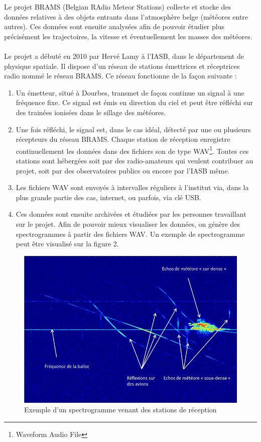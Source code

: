 \documentclass[11pt]{article}
\begin{document}
Le projet BRAMS (Belgian RAdio Meteor Stations) collecte et stocke des données relatives à des objets entrants dans l'atmosphère belge (météores entre autres).
Ces données sont ensuite analysées afin de pouvoir étudier plus précisément les trajectoires, la vitesse et éventuellement les masses des météores.\\
\\
Le projet a débuté en 2010 par Hervé Lamy à l'IASB, dans le département de physique spatiale.
Il dispose d'un réseau de stations émettrices et réceptrices radio nommé le réseau BRAMS.
Ce réseau fonctionne de la façon suivante :
\begin{enumerate}
    \item Un émetteur, situé à Dourbes, transmet de façon continue un signal à une fréquence fixe.
          Ce signal est émis en direction du ciel et peut être réfléchi sur des trainées ionisées dans le sillage des météores.
    \item Une fois réfléchi, le signal est, dans le cas idéal, détecté par une ou plusieurs récepteurs du réseau BRAMS.
          Chaque station de réception enregistre continuellement les données dans des fichiers son de type WAV\footnote{Waveform Audio File}.
          Toutes ces stations sont hébergées soit par des radio-amateurs qui veulent contribuer au projet, soit par des observatoires publics ou encore par l'IASB même.
    \item Les fichiers WAV sont envoyés à intervalles réguliers à l'institut via, dans la plus grande partie des cas, internet, ou parfois, via clé USB.
    \item Ces données sont ensuite archivées et étudiées par les personnes travaillant sur le projet.
          Afin de pouvoir mieux visualiser les données, on génère des spectrogrammes à partir des fichiers WAV.
          Un exemple de spectrogramme peut être visualisé sur la figure 2.
\end{enumerate}

\begin{figure}[t]
    \begin{center}
        \includegraphics[scale=0.493]{spectrogramme.png}
        \caption{Exemple d'un spectrogramme venant des stations de réception}
    \end{center}
\end{figure}
\end{document}
